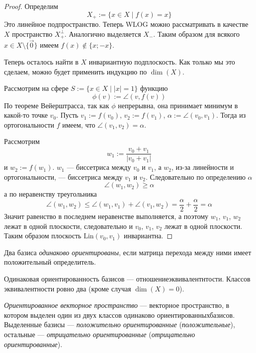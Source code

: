 \documentclass[12pt,a4paper]{article}
\newcommand{\Lin}{\ensuremath{\mathrm{Lin}}\xspace}
\begin{document}
    \begin{proof}
        Определим
        \[X_+ := \{x \in X \mid f(x) = x\}\]
        Это линейное подпространство. Теперь WLOG можно рассматривать в качестве $X$ пространство $X_+^\perp$. Аналогично выделяется $X_-$. Таким образом для всякого $x \in X \setminus \{\vec{0}\}$ имеем $f(x) \notin \{x; -x\}$.

        Теперь осталось найти в $X$ инвариантную подплоскость. Как только мы это сделаем, можно будет применить индукцию по $\dim(X)$.

        Рассмотрим на сфере $S := \{x \in X \mid |x| = 1\}$ функцию
        \[\phi(v) := \angle(v, f(v))\]
        По теореме Вейерштрасса, так как $\phi$ непрерывна, она принимает минимум в какой-то точке $v_0$. Пусть $v_1 := f(v_0)$, $v_2 := f(v_1)$, $\alpha := \angle(v_0, v_1)$. Тогда из ортогональности $f$ имеем, что $\angle(v_1, v_2) = \alpha$.
        
        Рассмотрим
        \[w_1 := \frac{v_0 + v_1}{|v_0 + v_1|}\]
        и $w_2 := f(w_1)$. $w_1$ --- биссетриса между $v_0$ и $v_1$, а $w_2$, из-за линейности и ортогональности, --- биссетриса между $v_1$ и $v_2$. Следовательно по определению $\alpha$
        \[\angle(w_1, w_2) \geqslant \alpha\]
        а по неравенству треугольника
        \[\angle(w_1, w_2) \leqslant \angle(w_1, v_1) + \angle(v_1, w_2) = \frac{\alpha}{2} + \frac{\alpha}{2} = \alpha\]
        Значит равенство в последнем неравенстве выполняется, а поэтому $w_1$, $v_1$, $w_2$ лежат в одной плоскости, следовательно и $v_0$, $v_1$, $v_2$ лежат в одной плоскости. Таким образом плоскость $\Lin(v_0, v_1)$ инвариантна.
    \end{proof}

    \begin{definition}
        Два базиса \emph{одинаково ориентированы}, если матрица перехода между ними имеет положительный определитель.
    \end{definition}

    \begin{theorem}
        Одинаковая ориентированность базисов --- отношениеэквивалентнтости. Классов эквивалентности ровно два (кроме случая $\dim(X) = 0$).
    \end{theorem}

    \begin{definition}
        \emph{Ориентированное векторное пространство} --- векторное пространство, в котором выделен один из двух классов одинаково ориентированныхбазисов. Выделенные базисы --- \emph{положительно ориентированные} (\emph{положительные}), остальные --- \emph{отрицательно ориентированные} (\emph{отрицательно ориентированные}).
    \end{definition}
\end{document}
